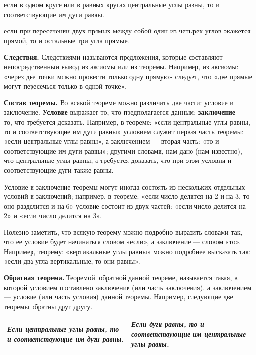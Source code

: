 \documentclass[oneside]{book}
\begin{document}
если в одном круге или в равных кругах центральные углы равны, то и соответствующие им дуги равны.

если при пересечении двух прямых между собой один из четырех углов окажется прямой, то и остальные три угла прямые.

\textbf{Следствия.}
Следствиями называются предложения, которые составляют непосредственный вывод из аксиомы или из теоремы.
Например, из аксиомы:
«через две точки можно провести только одну прямую» следует, что «две прямые могут пересечься только в одной точке».

\textbf{Состав теоремы.}
Во всякой теореме можно различить две части:
условие и заключение.
\textbf{Условие} выражает то, что предполагается данным;
\textbf{заключение} — то, что требуется доказать.
Например, в теореме:
«если центральные углы равны, то и соответствующие им дуги равны» условием служит первая часть теоремы:
«если центральные углы равны», а заключением — вторая часть:
«то и соответствующие им дуги равны»;
другими словами, нам дано (нам известно), что центральные углы равны, а требуется доказать, что при этом условии и соответствующие дуги также равны.

Условие и заключение теоремы могут иногда состоять из нескольких отдельных условий и заключений;
например, в теореме:
«если число делится на 2 и на 3, то оно разделится и на 6» условие состоит из двух частей:
«если число делится на 2» и «если число делится на 3».

Полезно заметить, что всякую теорему можно подробно выразить словами так, что ее условие будет начинаться словом «если», а заключение — словом «то».
Например, теорему:
«вертикальные углы равны» можно подробнее высказать так:
«если два угла вертикальные, то они равны».

\textbf{Обратная теорема.}
Теоремой, обратной данной теореме, называется такая, в которой условием поставлено заключение (или часть заключения), а заключением — условие (или часть условия) данной теоремы.
Например, следующие две теоремы обратны друг другу.

\medskip

\noindent
\begin{tabular}{ p{}| p{} }
\textbf{\emph{Если центральные углы равны, то и соответствующие им дуги равны.}}
&
\textbf{\emph{Если дуги равны, то и соответствующие им центральные углы равны.}}
\end{tabular}

\medskip
\end{document}
